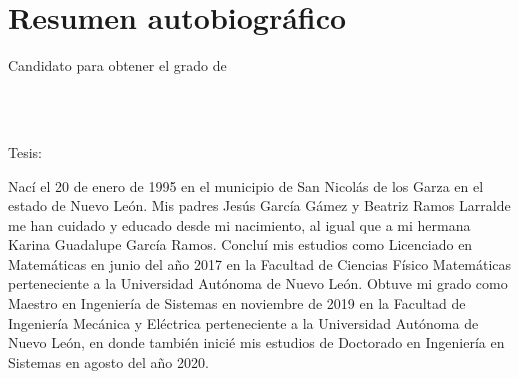 
\chapter*{Resumen autobiográfico}
\thispagestyle{empty}

\begin{center}
\autor

Candidato para obtener el grado de\\
\grado\\
\orientacion\bigskip

\uanl\\
\fime\bigskip

Tesis:\\
\textsc{\large\titulo}
\end{center}\bigskip


Nací el 20 de enero de 1995 en el municipio de San Nicolás de los Garza en el estado de Nuevo León. Mis padres Jesús García Gámez y Beatriz Ramos Larralde me han cuidado y educado desde mi nacimiento, al igual que a mi hermana Karina Guadalupe García Ramos. Concluí mis estudios como Licenciado en Matemáticas en junio del año 2017 en la Facultad de Ciencias Físico Matemáticas perteneciente a la Universidad Autónoma de Nuevo León. Obtuve mi grado como Maestro en Ingeniería de Sistemas en noviembre de 2019 en la Facultad de Ingeniería Mecánica y Eléctrica perteneciente a la Universidad Autónoma de Nuevo León, en donde también inicié mis estudios de Doctorado en Ingeniería en Sistemas en agosto del año 2020.